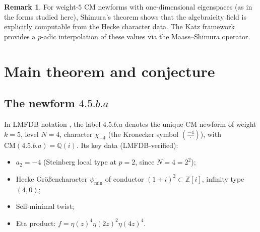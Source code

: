 \documentclass[10pt]{article}
\theoremstyle{definition}
\newtheorem{remark}[theorem]{Remark}
\newcommand{\Q}{\mathbb{Q}}
\newcommand{\Z}{\mathbb{Z}}
\begin{document}
\begin{remark}
For weight-$5$ CM newforms with one-dimensional eigenspaces (as in the forms
studied here), Shimura's theorem \cite{Shi76} shows that the algebraicity field
is explicitly computable from the Hecke character data.  The Katz framework
\cite{Kat76, Kat78} provides a $p$-adic interpolation of these values via
the Maass--Shimura operator.
\end{remark}


\section{Main theorem and conjecture}
\label{sec:main}

\subsection{The newform \texorpdfstring{$4.5.b.a$}{4.5.b.a}}

In LMFDB notation \cite{LMFDB}, the label $4.5.b.a$ denotes the unique CM newform of
weight $k=5$, level $N=4$, character $\chi_{-4}$ (the Kronecker symbol
$\left(\frac{-4}{\cdot}\right)$), with $\mathrm{CM}(\mathit{4.5.b.a}) = \Q(i)$.
Its key data (LMFDB-verified):
\begin{itemize}
  \item $a_2 = -4$ (Steinberg local type at $p=2$, since $N=4=2^2$);
  \item Hecke Gr\"{o}{\ss}encharacter $\psi_{\min}$ of conductor $(1+i)^2 \subset \Z[i]$,
        infinity type $(4,0)$;
  \item Self-minimal twist;
  \item Eta product: $f = \eta(z)^4\eta(2z)^2\eta(4z)^4$.
\end{itemize}
\end{document}

